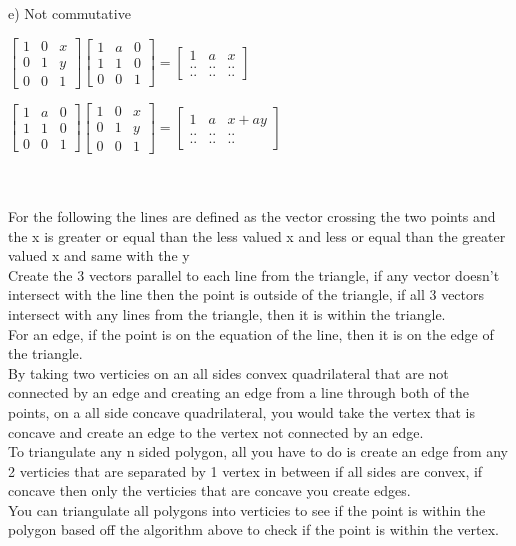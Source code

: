 \documentclass[12pt,a4paper]{article}
\begin{document}
e) Not commutative

$
\begin{bmatrix}
1 &0 &x\\
0 &1& y\\
0 &0& 1
\end{bmatrix}
\begin{bmatrix}
1&a&0\\
1&1&0\\
0&0&1
\end{bmatrix} = \begin{bmatrix}
1&a&x\\
..&..&..\\
..&..&..
\end{bmatrix}$

$
\begin{bmatrix}
1&a&0\\
1&1&0\\
0&0&1
\end{bmatrix}
\begin{bmatrix}
1 &0 &x\\
0 &1& y\\
0 &0& 1
\end{bmatrix}
 = \begin{bmatrix}
1&a&x+ay\\
..&..&..\\
..&..&..
\end{bmatrix}$

\section{}
${}$

For the following the lines are defined as the vector crossing the two points and the x is greater or equal than the less valued x and less or equal than the greater valued x and same with the y
\\

Create the 3 vectors parallel to each line from the triangle, if any vector doesn't intersect with the line then the point is outside of the triangle, if all 3 vectors intersect with any lines from the triangle, then it is within the triangle.
\\

For an edge, if the point is on the equation of the line, then it is on the edge of the triangle.
\\

By taking two verticies on an all sides convex quadrilateral that are not connected by an edge and creating an edge from a line through both of the points, on a all side concave quadrilateral, you would take the vertex that is concave and create an edge to the vertex not connected by an edge.
\\

To triangulate any n sided polygon, all you have to do is create an edge from any 2 verticies that are separated by 1 vertex in between if all sides are convex, if concave then only the verticies that are concave you create edges.
\\

You can triangulate all polygons into verticies to see if the point is within the polygon based off the algorithm above to check if the point is within the vertex.
\end{document}
